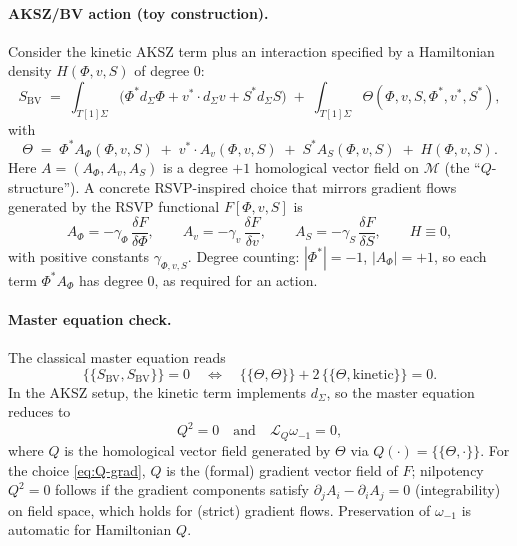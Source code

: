 \documentclass[12pt]{article}
\begin{document}
\paragraph{AKSZ/BV action (toy construction).}
Consider the kinetic AKSZ term plus an interaction specified by a Hamiltonian density $H(\Phi,v,S)$ of degree $0$:
\begin{equation}
S_{\mathrm{BV}} \;=\; \int_{T[1]\Sigma}\!\Big(
\Phi^\ast d_\Sigma \Phi
+ v^\ast \!\cdot d_\Sigma v
+ S^\ast d_\Sigma S\Big)
\;+\; \int_{T[1]\Sigma}\!\Theta(\Phi,v,S,\Phi^\ast,v^\ast,S^\ast),
\end{equation}
with
\begin{equation}
\Theta \;=\; \Phi^\ast A_\Phi(\Phi,v,S)
\;+\; v^\ast \!\cdot A_v(\Phi,v,S)
\;+\; S^\ast A_S(\Phi,v,S)
\;+\; H(\Phi,v,S).
\end{equation}
Here $A=(A_\Phi,A_v,A_S)$ is a degree $+1$ homological vector field on $\mathcal M$ (the ``$Q$-structure''). A concrete RSVP-inspired choice that mirrors gradient flows generated by the RSVP functional $F[\Phi,v,S]$ is
\begin{equation}
A_\Phi = -\gamma_\Phi\,\frac{\delta F}{\delta \Phi},\qquad
A_v     = -\gamma_v\,\frac{\delta F}{\delta v},\qquad
A_S     = -\gamma_S\,\frac{\delta F}{\delta S},
\qquad H \equiv 0,
\label{eq:Q-grad}
\end{equation}
with positive constants $\gamma_{\Phi,v,S}$. Degree counting: $|\Phi^\ast|=-1$, $|A_\Phi|=+1$, so each term $\Phi^\ast A_\Phi$ has degree $0$, as required for an action.

\paragraph{Master equation check.}
The classical master equation reads
\[
\{\!\{S_{\mathrm{BV}},S_{\mathrm{BV}}\}\!\}=0 \quad\Longleftrightarrow\quad
\{\!\{\Theta,\Theta\}\!\} + 2\,\{\!\{\Theta, \text{kinetic}\}\!\}=0.
\]
In the AKSZ setup, the kinetic term implements $d_\Sigma$, so the master equation reduces to
\[
Q^2=0 \quad\text{and}\quad \mathcal L_Q \omega_{-1}=0,
\]
where $Q$ is the homological vector field generated by $\Theta$ via $Q(\cdot)=\{\!\{\Theta,\cdot\}\!\}$. For the choice \eqref{eq:Q-grad}, $Q$ is the (formal) gradient vector field of $F$; nilpotency $Q^2=0$ follows if the gradient components satisfy $\partial_jA_i-\partial_iA_j=0$ (integrability) on field space, which holds for (strict) gradient flows. Preservation of $\omega_{-1}$ is automatic for Hamiltonian $Q$.
\end{document}
